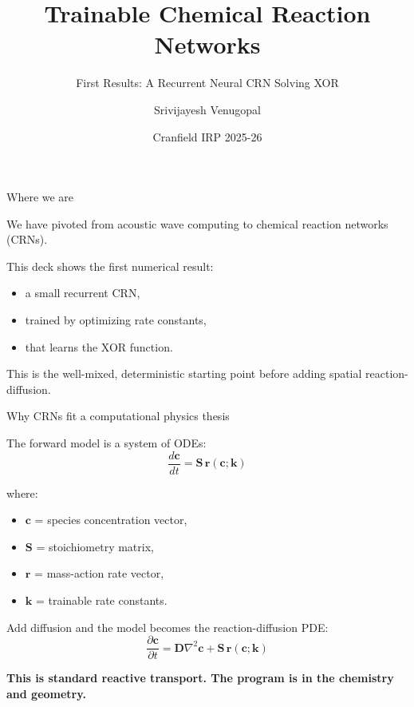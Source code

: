 \documentclass[aspectratio=169,11pt]{beamer}
\title{Trainable Chemical Reaction Networks}
\subtitle{First Results: A Recurrent Neural CRN Solving XOR}
\author{Srivijayesh Venugopal}
\date{Cranfield IRP 2025-26}
\begin{document}
\begin{frame}
\titlepage
\end{frame}

\begin{frame}{Where we are}

We have pivoted from acoustic wave computing to chemical reaction networks (CRNs).

\vspace{0.3cm}
This deck shows the first numerical result:
\begin{itemize}
    \item a small recurrent CRN,
    \item trained by optimizing rate constants,
    \item that learns the XOR function.
\end{itemize}

\vspace{0.3cm}
This is the well-mixed, deterministic starting point before adding spatial reaction-diffusion.

\end{frame}

\begin{frame}{Why CRNs fit a computational physics thesis}

The forward model is a system of ODEs:
\begin{equation*}
    \frac{d\mathbf{c}}{dt} = \mathbf{S}\,\mathbf{r}(\mathbf{c}; \mathbf{k})
\end{equation*}

\vspace{0.2cm}
where:
\begin{itemize}
    \item $\mathbf{c}$ = species concentration vector,
    \item $\mathbf{S}$ = stoichiometry matrix,
    \item $\mathbf{r}$ = mass-action rate vector,
    \item $\mathbf{k}$ = trainable rate constants.
\end{itemize}

\vspace{0.3cm}
Add diffusion and the model becomes the reaction-diffusion PDE:
\begin{equation*}
    \frac{\partial \mathbf{c}}{\partial t} = \mathbf{D}\nabla^2 \mathbf{c} + \mathbf{S}\,\mathbf{r}(\mathbf{c}; \mathbf{k})
\end{equation*}

\vspace{0.2cm}
\centering
\textbf{This is standard reactive transport. The program is in the chemistry and geometry.}

\end{frame}
\end{document}
